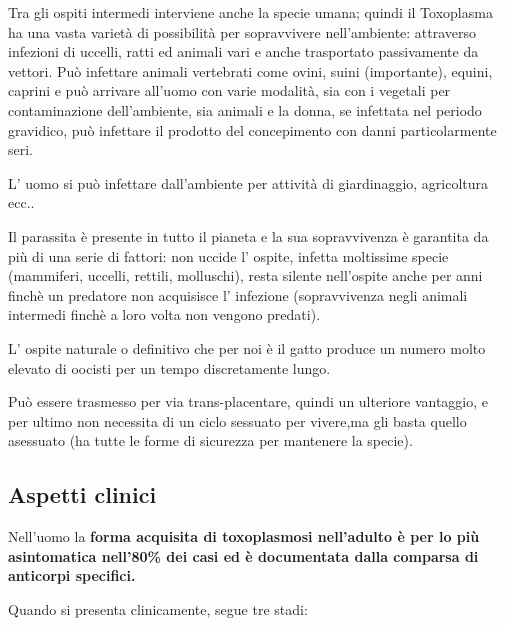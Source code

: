   Tra gli ospiti intermedi interviene anche la specie umana; quindi il
  Toxoplasma ha una vasta varietà di possibilità per sopravvivere
  nell'ambiente: attraverso infezioni di uccelli, ratti ed animali vari
  e anche trasportato passivamente da vettori. Può infettare animali
  vertebrati come ovini, suini (importante), equini, caprini e può
  arrivare all'uomo con varie modalità, sia con i vegetali per
  contaminazione dell'ambiente, sia animali e la donna, se infettata nel
  periodo gravidico, può infettare il prodotto del concepimento con
  danni particolarmente seri.

  L' uomo si può infettare dall'ambiente per attività di giardinaggio,
  agricoltura ecc..

  Il parassita è presente in tutto il pianeta e la sua sopravvivenza è
  garantita da più di una serie di fattori: non uccide l' ospite,
  infetta moltissime specie (mammiferi, uccelli, rettili, molluschi),
  resta silente nell'ospite anche per anni finchè un predatore non
  acquisisce l' infezione (sopravvivenza negli animali intermedi finchè
  a loro volta non vengono predati).

  L' ospite naturale o definitivo che per noi è il gatto produce un
  numero molto elevato di oocisti per un tempo discretamente lungo.

  Può essere trasmesso per via trans-placentare, quindi un ulteriore
  vantaggio, e per ultimo non necessita di un ciclo sessuato per
  vivere,ma gli basta quello asessuato (ha tutte le forme di sicurezza
  per mantenere la specie).

\subsection{Aspetti clinici}

  Nell'uomo la \textbf{forma acquisita di toxoplasmosi nell'adulto è per
  lo più asintomatica nell'80\% dei casi ed è documentata dalla comparsa
  di anticorpi specifici.}

  Quando si presenta clinicamente, segue tre stadi:

